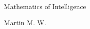 \begin{titlepage}
  \thispagestyle{empty}
  \centering
  \vspace*{4.2cm}
  {\LARGE Mathematics of Intelligence\par}
  \vspace{2.4cm}
  {\large Martin M. W.\par}
\end{titlepage}
